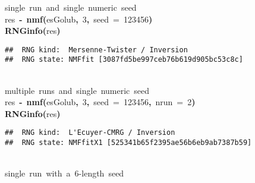 \documentclass[a4paper]{article}\usepackage{graphicx, color}
\makeatletter
\newcommand{\hlnumber}[1]{\textcolor[rgb]{0,0,0}{#1}}%
\newcommand{\hlfunctioncall}[1]{\textcolor[rgb]{0.501960784313725,0,0.329411764705882}{\textbf{#1}}}%
\newcommand{\hlkeyword}[1]{\textcolor[rgb]{0,0,0}{\textbf{#1}}}%
\newcommand{\hlargument}[1]{\textcolor[rgb]{0.690196078431373,0.250980392156863,0.0196078431372549}{#1}}%
\newcommand{\hlcomment}[1]{\textcolor[rgb]{0.180392156862745,0.6,0.341176470588235}{#1}}%
\newcommand{\hlassignement}[1]{\textcolor[rgb]{0,0,0}{\textbf{#1}}}%
\newcommand{\hlsymbol}[1]{\textcolor[rgb]{0,0,0}{#1}}%
\newcommand{\hlstd}[1]{\textcolor[rgb]{0,0,0}{#1}}%
\newenvironment{kframe}{%
 \def\FrameCommand##1{\hskip\@totalleftmargin \hskip-\fboxsep
 \colorbox{shadecolor}{##1}\hskip-\fboxsep
     \hskip-\linewidth \hskip-\@totalleftmargin \hskip\columnwidth}%
 \MakeFramed {\advance\hsize-\width
   \@totalleftmargin\z@ \linewidth\hsize
   \@setminipage}}%
 {\par\unskip\endMakeFramed}
\newenvironment{knitrout}{}{} %
\makeatother
\begin{document}
\begin{knitrout}
\color{fgcolor}\begin{kframe}
\begin{flushleft}
\ttfamily\noindent
\hlcomment{\usebox{\hlnormalsizeboxhash}{\ }single{\ }run{\ }and{\ }single{\ }numeric{\ }seed}\hspace*{\fill}\\
\hlstd{}\hlsymbol{res}{\ }\hlassignement{\usebox{\hlnormalsizeboxlessthan}-}{\ }\hlfunctioncall{nmf}\hlkeyword{(}\hlsymbol{esGolub}\hlkeyword{,}{\ }\hlnumber{3}\hlkeyword{,}{\ }\hlargument{seed}{\ }\hlargument{=}{\ }\hlnumber{123456}\hlkeyword{)}\hspace*{\fill}\\
\hlstd{}\hlfunctioncall{RNGinfo}\hlkeyword{(}\hlsymbol{res}\hlkeyword{)}\mbox{}
\normalfont
\end{flushleft}
\begin{verbatim}
##  RNG kind:  Mersenne-Twister / Inversion 
##  RNG state: NMFfit [3087fd5be997ceb76b619d905bc53c8c] 
\end{verbatim}
\begin{flushleft}
\ttfamily\noindent
\hspace*{\fill}\\
\hlstd{}\hlcomment{\usebox{\hlnormalsizeboxhash}{\ }multiple{\ }runs{\ }and{\ }single{\ }numeric{\ }seed}\hspace*{\fill}\\
\hlstd{}\hlsymbol{res}{\ }\hlassignement{\usebox{\hlnormalsizeboxlessthan}-}{\ }\hlfunctioncall{nmf}\hlkeyword{(}\hlsymbol{esGolub}\hlkeyword{,}{\ }\hlnumber{3}\hlkeyword{,}{\ }\hlargument{seed}{\ }\hlargument{=}{\ }\hlnumber{123456}\hlkeyword{,}{\ }\hlargument{nrun}{\ }\hlargument{=}{\ }\hlnumber{2}\hlkeyword{)}\hspace*{\fill}\\
\hlstd{}\hlfunctioncall{RNGinfo}\hlkeyword{(}\hlsymbol{res}\hlkeyword{)}\mbox{}
\normalfont
\end{flushleft}
\begin{verbatim}
##  RNG kind:  L'Ecuyer-CMRG / Inversion 
##  RNG state: NMFfitX1 [525341b65f2395ae56b6eb9ab7387b59] 
\end{verbatim}
\begin{flushleft}
\ttfamily\noindent
\hspace*{\fill}\\
\hlstd{}\hlcomment{\usebox{\hlnormalsizeboxhash}{\ }single{\ }run{\ }with{\ }a{\ }6-length{\ }seed}\hspace*{\fill}\\

\end{flushleft}
\end{kframe}
\end{knitrout}
\end{document}
